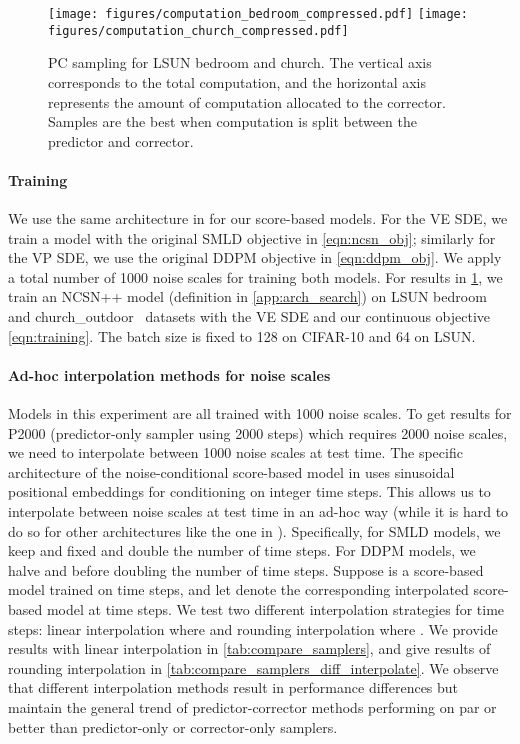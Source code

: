 \documentclass{article} \usepackage{iclr2021_conference,times}
\begin{document}
\begin{figure}[h]
    \centering
    \texttt{[image: figures/computation\_bedroom\_compressed.pdf]}
    \texttt{[image: figures/computation\_church\_compressed.pdf]}
    \caption{PC sampling for LSUN bedroom and church. The vertical axis corresponds to the total computation, and the horizontal axis represents the amount of computation allocated to the corrector. Samples are the best when computation is split between the predictor and corrector.}
    \label{fig:computation}
\end{figure}




\paragraph{Training} 
We use the same architecture in \cite{ho2020denoising} for our score-based models. For the VE SDE, we train a model with the original SMLD objective in \cref{eqn:ncsn_obj}; similarly for the VP SDE, we use the original DDPM objective in \cref{eqn:ddpm_obj}. We apply a total number of 1000 noise scales for training both models. For results in \cref{fig:computation}, we train an NCSN++ model (definition in \cref{app:arch_search}) on  LSUN bedroom and church\_outdoor~\citep{yu2015lsun} datasets with the VE SDE and our continuous objective \cref{eqn:training}. The batch size is fixed to 128 on CIFAR-10 and 64 on LSUN.

\paragraph{Ad-hoc interpolation methods for noise scales} 
Models in this experiment are all trained with 1000 noise scales. To get results for P2000 (predictor-only sampler using 2000 steps) which requires 2000 noise scales, we need to interpolate between 1000 noise scales at test time. The specific architecture of the noise-conditional score-based model in \citet{ho2020denoising} uses sinusoidal positional embeddings for conditioning on integer time steps. This allows us to interpolate between noise scales at test time in an ad-hoc way (while it is hard to do so for other architectures like the one in \citet{song2019generative}). Specifically, for SMLD models, we keep  and  fixed and double the number of time steps. For DDPM models, we halve  and  before doubling the number of time steps. Suppose  is a score-based model trained on  time steps, and let  denote the corresponding interpolated score-based model at  time steps. We test two different interpolation strategies for time steps: linear interpolation where  and rounding interpolation where . We provide results with linear interpolation in \cref{tab:compare_samplers}, and give results of rounding interpolation in \cref{tab:compare_samplers_diff_interpolate}. We observe that different interpolation methods result in performance differences but maintain the general trend of predictor-corrector methods performing on par or better than predictor-only or corrector-only samplers.
\end{document}
